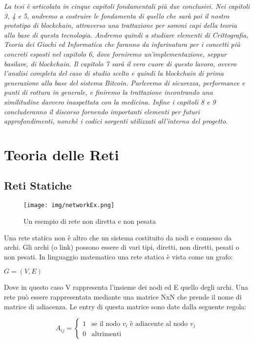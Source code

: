 \documentclass[12pt,twoside]{report}
\begin{document}
	\vskip 20pt
	\textit{La tesi è articolata in cinque capitoli fondamentali più due conclusivi. Nei capitoli 3, 4 e 5, andremo a costruire le fondamenta di quello che sarà poi il nostro prototipo di blockchain, attraverso una trattazione per sommi capi della teoria alla base di questa tecnologia. Andremo quindi a studiare elementi di Crittografia, Teoria dei Giochi ed Informatica che faranno da infarinatura per i concetti più concreti esposti nel capitolo 6, dove forniremo un'implementazione, seppur basilare, di blockchain. Il capitolo 7 sarà il vero cuore di questo lavoro, ovvero l'analisi completa del caso di studio scelto e quindi la blockchain di prima generazione alla base del sistema Bitcoin. Parleremo di sicurezza, performance e punti di rottura in generale, e finiremo la trattazione incontrando una similitudine davvero inaspettata con la medicina. Infine i capitoli 8 e 9 concluderanno il discorso fornendo importanti elementi per futuri approfondimenti, nonchè i codici sorgenti utilizzati all'interno del progetto.}
	
	\chapter{Teoria delle Reti}
	\section{Reti Statiche}
	\vskip 20pt
	\begin{figure}[htb]
		\centering
		\texttt{[image: img/networkEx.png]}
		\caption{Un esempio di rete non diretta e non pesata}\label{fig:1}
	\end{figure}
	\vskip 20pt
	Una rete statica non è altro che un sistema costituito da nodi e connesso da archi. Gli archi (o link) possono essere di vari tipi, diretti, non diretti, pesati o non pesati. In linguaggio matematico una rete statica è vista come un grafo:
	
	\begin{center}
	    \large$G = (V, E)$ 
	\end{center}
	
	Dove in questo caso V rappresenta l'insieme dei nodi ed E quello degli archi.
	Una rete può essere rappresentata mediante una matrice NxN che prende il nome di matrice di adiacenza. Le entry di questa matrice sono date dalla seguente regola:
	
	\begin{equation}
	A_{ij} = \left\{\begin{array}{rcl}
	{1} & \mbox{se il nodo $v_i$ è adiacente al nodo $v_j$}
	\\ {0} & \mbox{altrimenti} 
	\end{array}\right.
	\end{equation}\vskip 10pt
	
\end{document}
